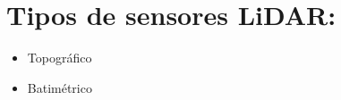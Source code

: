 \section*{Tipos de sensores LiDAR:}
\begin{itemize}
	\item Topográfico 
	\item Batimétrico  
\end{itemize}





